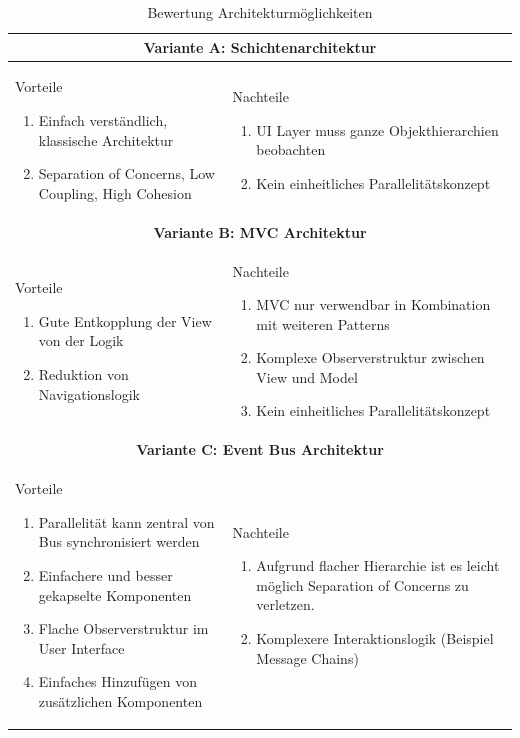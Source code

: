 \begin{table}[H]
\begin{tabular}{|p{}|p{}|}
 \hline 
\multicolumn{2}{|c|}{\textbf{Variante A: Schichtenarchitektur}}\\ \hline 
Vorteile
\begin{enumerate}
\item Einfach verständlich, klassische Architektur
\item Separation of Concerns, Low Coupling, High Cohesion
\end{enumerate} & 
Nachteile
\begin{enumerate}
\item \ac{UI} Layer muss ganze Objekthierarchien beobachten
\item Kein einheitliches Parallelitätskonzept
\end{enumerate}
\\ \hline

\multicolumn{2}{|c|}{\textbf{Variante B: MVC Architektur}}\\ \hline 
Vorteile
\begin{enumerate}
\item Gute Entkopplung der View von der Logik
\item Reduktion von Navigationslogik
\end{enumerate} &
Nachteile
\begin{enumerate}
\item \ac{MVC} nur verwendbar in Kombination mit weiteren Patterns
\item Komplexe Observerstruktur zwischen View und Model
\item Kein einheitliches Parallelitätskonzept
\end{enumerate}
\\ \hline

\multicolumn{2}{|c|}{\textbf{Variante C: Event Bus Architektur}}\\ \hline 
Vorteile
\begin{enumerate}
\item Parallelität kann zentral von Bus synchronisiert werden
\item Einfachere und besser gekapselte Komponenten
\item Flache Observerstruktur im User Interface
\item Einfaches Hinzufügen von zusätzlichen Komponenten
\end{enumerate} &
Nachteile
\begin{enumerate}
\item Aufgrund flacher Hierarchie ist es leicht möglich Separation of Concerns zu verletzen.
\item Komplexere Interaktionslogik (Beispiel Message Chains)
\end{enumerate}
\\ \hline
\end{tabular}
\caption{Bewertung Architekturmöglichkeiten}
\end{table}


